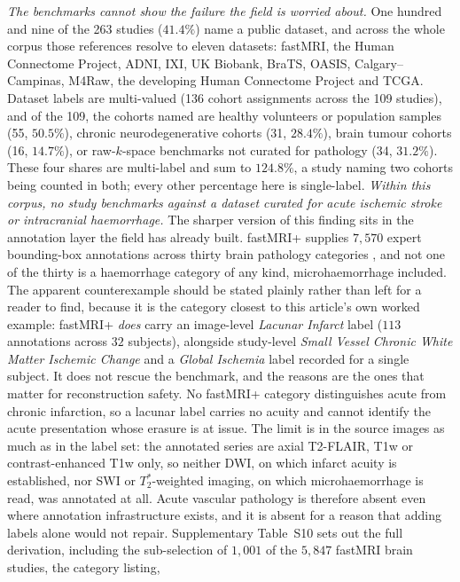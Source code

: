 \documentclass[review,authoryear]{elsarticle}
\begin{document}
\emph{The benchmarks cannot show the failure the field is worried about.} One hundred
and nine of
the 263 studies ($41.4\%$) name a public dataset, and across the whole corpus those
references resolve to eleven datasets: fastMRI, the Human Connectome Project, ADNI, IXI,
UK Biobank, BraTS, OASIS, Calgary--Campinas, M4Raw, the developing Human Connectome
Project and TCGA. Dataset labels are multi-valued
(136 cohort assignments across the 109 studies), and of the 109, the cohorts named are
healthy volunteers or population samples (55, $50.5\%$), chronic neurodegenerative
cohorts (31, $28.4\%$), brain tumour cohorts (16, $14.7\%$), or raw-$k$-space
benchmarks not curated for pathology (34, $31.2\%$). These four shares are multi-label
and sum to $124.8\%$, a study naming two cohorts being counted in both; every other
percentage here is single-label. \emph{Within this corpus, no study
benchmarks against a dataset curated for acute ischemic stroke or intracranial
haemorrhage.} The sharper version of this finding sits in the annotation layer the
field has already built. fastMRI+ supplies $7{,}570$ expert bounding-box annotations
across thirty brain pathology categories \citep{zhao2022fastmriplus}, and not one of the
thirty is a haemorrhage category of any kind, microhaemorrhage included. The apparent
counterexample should be stated plainly rather than left for a reader to find, because it
is the category closest to this article's own worked example: fastMRI+ \emph{does} carry
an image-level \emph{Lacunar Infarct} label ($113$ annotations across $32$ subjects),
alongside study-level \emph{Small Vessel Chronic White Matter Ischemic Change} and a
\emph{Global Ischemia} label recorded for a single subject. It does not rescue the
benchmark, and the reasons are the ones that matter for reconstruction safety. No
fastMRI+ category distinguishes acute from chronic infarction, so a lacunar label carries
no acuity and cannot identify the acute presentation whose erasure is at issue. The
limit is in the source images as much as in the label set: the annotated series are
axial T2-FLAIR, T1w or contrast-enhanced T1w only, so neither DWI, on which infarct
acuity is established, nor SWI or $T_2^{*}$-weighted imaging, on which microhaemorrhage
is read, was annotated at all. Acute vascular pathology is therefore absent even where
annotation infrastructure exists, and it is absent for a reason that adding labels alone
would not repair. Supplementary Table~S10 sets out the full derivation, including the
sub-selection of $1{,}001$ of the $5{,}847$ fastMRI brain studies, the category listing,
\end{document}

